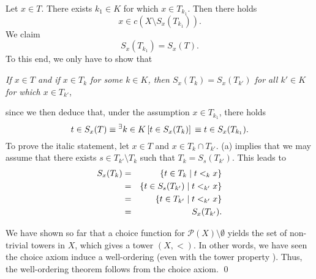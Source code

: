 \documentclass[a4paper,12pt]{article}
\begin{document}
\begin{sol}
	Let \(  x \in T \).
	There exists \( k_1 \in K \) for which \(  x \in T_{k_1} \).
	Then there holds
	\begin{equation*}
		x\in c(X \setminus S_{x}(T_{k_1})).
	\end{equation*}
	We claim
	\begin{equation*}
		S_{x}(T_{k_1}) = S_x(T).
	\end{equation*}
	To this end, we only have to show that \leavevmode \par
	\noindent\textit{If \(  x \in T \) and if \(  x \in T_k \) for some \( k\in K \),
		then \( S_{x}(T_{k}) = S_{x}(T_{k'}) \) for all \( k' \in K \)
		for which \(  x \in T_{k'} \)},\leavevmode \par\noindent
	since we then deduce that, under the assumption \(  x \in T_{k_1} \),
	there holds
	\begin{equation*}
		t\in S_{x}(T)
		\equiv
		{}^{\exists} k\in K\left[ t\in S_{x}(T_{k}) \right]\\
		\equiv
		t\in S_{x}(T_{k_1}).
	\end{equation*}
	To prove the italic statement, let \(  x \in T \) and \(  x \in T_{k} \cap T_{k'} \).
	(a) implies that we may assume that there exists
	\( s \in T_{k'} \setminus T_{k} \)
	such that \( T_{k}=S_{s}(T_{k'}) \).
	This leads to
	\begin{eqnarray*}
		S_x(T_{k})
		&=&
		\left\{ t\in T_k \;|\; t<_{k}x \right\}\\
		&=&
		\left\{ t\in S_{s}(T_{k'}) \;|\; t<_{k'}x \right\}\\
		&=&
		\left\{ t\in T_{k'} \;|\; t<_{k'}x \right\}\\
		&=&
		S_{x}(T_{k'}).
	\end{eqnarray*}
	
	We have shown so far that a choice function for
	\( \mathcal{P}(X)\setminus \emptyset \)
	yields the set of non-trivial towers in \( X \),
	which gives a tower \( (X,<) \).
	In other words,
	we have seen the choice axiom induce a well-ordering (even with the tower property ).
	Thus, the well-ordering theorem follows from the choice axiom.
	\qed\end{sol}
\end{document}
